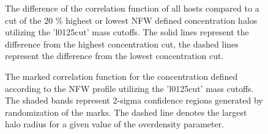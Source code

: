 \documentclass[usenatbib,usegraphicx,letterpaper]{mn2e}
\begin{document}
\begin{figure}
	\centering
	\caption{The difference of the correlation function of all hosts compared to a cut of the 20 \% highest or lowest NFW defined concentration halos utilizing the 'l0125cut' mass cutoffs. The solid lines represent the difference from the highest concentration cut, the dashed lines represent the difference from the lowest concentration cut.}
\end{figure}

\begin{figure}
	\centering
	\caption{The marked correlation function for the concentration defined according to the NFW profile utilizing the 'l0125cut' mass cutoffs. The shaded bands represent 2-sigma confidence regions generated by randomization of the marks. The dashed line denotes the largest halo radius for a given value of the overdensity parameter.}
\end{figure}
\end{document}
